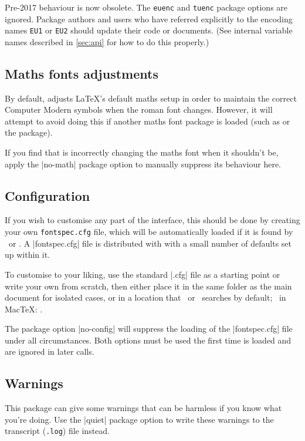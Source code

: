 \documentclass[a4paper]{l3doc}
\begin{document}
Pre-2017 behaviour is now obsolete. The \texttt{euenc} and \texttt{tuenc} package options are
ignored. Package authors and users who have referred explicitly to the encoding names \texttt{EU1} or \texttt{EU2} should update their code or documents.
(See internal variable names described in \vref{sec:api} for how to do this properly.)


\subsection{Maths fonts adjustments}
By default,  adjusts \LaTeX's default maths setup in order to maintain the correct Computer Modern symbols when the roman font changes.
However, it will attempt to avoid doing this if another maths font package is loaded (such as  or the  package).

If you find that  is incorrectly changing the maths font when it shouldn't be, apply the |no-math| package option to manually suppress its behaviour here.


\subsection{Configuration}
\label{sec:config}

If you wish to customise any part of the
 interface, this should be done by creating your own
\texttt{fontspec.cfg} file,
which will be automatically loaded if it is found by \XeTeX\ or \LuaTeX.
A |fontspec.cfg| file is distributed with  with a small number of defaults set up within it.

To customise  to your liking, use the standard |.cfg| file as a starting point or write your own from scratch, then either place it in the same folder as the main document for isolated cases, or in a location
that \XeTeX\ or \LuaTeX\ searches by default; \eg\ in Mac\TeX: .

The package option |no-config| will suppress the loading of the |fontspec.cfg| file under all circumstances. Both options must be used the first time  is loaded and are ignored in later calls.


\subsection{Warnings}
\label{sec:quiet-warnings}

This package can give some warnings that can be harmless if you know what
you're doing. Use the |quiet| package option to write these warnings to the
transcript (\texttt{.log}) file instead.
\end{document}
